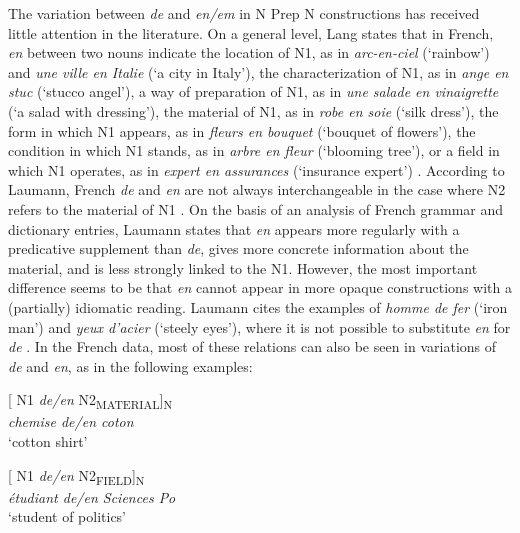 \documentclass[output=paper]{langsci/langscibook}
\begin{document}
The variation between \textit{de} and \textit{en/em} in N Prep N constructions has received little attention in the literature. On a general level, Lang states that in French, \textit{en} between two nouns indicate the location of N1, as in \textit{arc-en-ciel} (`rainbow') and \textit{une ville en Italie} (`a city in Italy'), the characterization of N1, as in \textit{ange en stuc} (`stucco angel'), a way of preparation of N1, as in \textit{une salade en vinaigrette} (`a salad with dressing'), the material of N1, as in \textit{robe en soie} (`silk dress'), the form in which N1 appears, as in \textit{fleurs en bouquet} (`bouquet of flowers'), the condition in which N1 stands, as in \textit{arbre en fleur} (`blooming tree'), or a field in which N1 operates, as in \textit{expert en assurances} (`insurance expert') \citep[411]{Lang:1991}. According to Laumann, French\textit{ de} and \textit{en} are not always interchangeable in the case where N2 refers to the material of N1 \citep[55]{Laumann:1998}. On the basis of an analysis of French grammar and dictionary entries, Laumann states that \textit{en} appears more regularly with a predicative supplement than \textit{de}, gives more concrete information about the material, and is less strongly linked to the N1. However, the most important difference seems to be that \textit{en} cannot appear in more opaque constructions with a (partially) idiomatic reading. Laumann cites the examples of \textit{homme de fer} (`iron man') and \textit{yeux d’acier} (`steely eyes'), where it is not possible to substitute \textit{en} for \textit{de} \citep[55]{Laumann:1998}. In the French data, most of these relations can also be seen in variations of \textit{de} and \textit{en}, as in the following examples:

\begin{exe}\ex\begin{minipage}[t]{0.4\textwidth}    %
[ N1 \textit{de/en} N2\textsubscript{MATERIAL}]\textsubscript{N}\\
\textit{chemise de/en coton}\\
`cotton shirt'
\end{minipage}\hfill            %
\begin{minipage}[t]{0.45\textwidth}
[ N1 \textit{de/en} N2\textsubscript{FIELD}]\textsubscript{N}\\
\textit{étudiant de/en Sciences Po}\\
`student of politics'
\end{minipage}
\end{exe}
\end{document}
